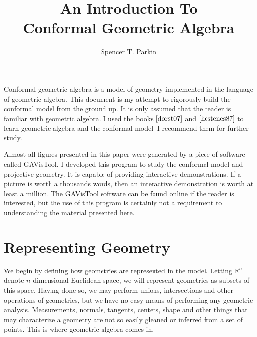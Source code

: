\documentclass[12pt]{article}
\title{An Introduction To\\Conformal Geometric Algebra}
\author{Spencer T. Parkin}
\newcommand{\R}{\mathbb{R}}
\begin{document}
\maketitle

Conformal geometric algebra is a model of
geometry implemented in the language of geometric algebra.
This document is my attempt to rigorously build the
conformal model from the ground up.
It is only assumed that the reader is familiar with geometric algebra.
I used the books $\cite{dorst07}$ and $\cite{hestenes87}$
to learn geometric algebra and the conformal model.
I recommend them for further study.

Almost all figures presented in this paper were generated by
a piece of software called GAVisTool. I developed this program to study the conformal model
and projective geometry.
It is capable of providing interactive demonstrations.  If a picture is worth a thousands
words, then an interactive demonstration is worth at least a million.
The GAVisTool software can be found online if the reader is interested, but the
use of this program is certainly not a requirement to understanding the material presented here.

\section{Representing Geometry}

We begin by defining how geometries are represented in the model.
Letting $\R^n$ denote $n$-dimensional Euclidean space, we will
represent geometries as subsets of this space.  Having done so,
we may perform unions, intersections and other operations of geometries, but we
have no easy means of performing any geometric analysis.  Measurements, normals,
tangents, centers, shape and other things that may characterize a geometry are not
so easily gleaned or inferred from a set of points.  This is where
geometric algebra comes in.
\end{document}
